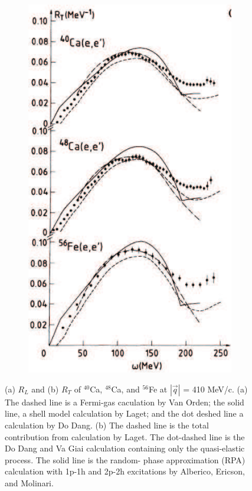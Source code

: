 \begin{figure}
\begin{subfigure}{.5\textwidth}
\includegraphics[width=.8\linewidth]{figs/R_T_q_410.png}
\label{fig:R_T_q_410}
\end{subfigure}
\caption[R LT q 410]{
(a) $R_L$ and (b) $R_T$ of $^{40}$Ca, $^{48}$Ca, and $^{56}$Fe at $|\vec{q}|$ = 410 MeV/c.
(a) The dashed line is a Fermi-gas caculation by Van Orden; the solid
line, a shell model calculation by Laget; and the dot deshed line a calculation
by Do Dang. (b) The dashed line is the total contribution from calculation
by Laget. The dot-dashed line is the Do Dang and Va Giai calculation
containing only the quasi-elastic process. The solid line is the random-
phase approximation (RPA) calculation with 1p-1h and 2p-2h excitations
by Alberico, Ericson, and Molinari.
\label{fig:R_LT_q_410}}
\end{figure}


